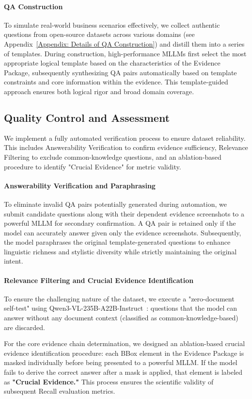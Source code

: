 \documentclass{llmxive}
\begin{document}
{\paragraph{QA Construction}
To simulate real-world business scenarios effectively, we collect authentic questions from open-source datasets across various domains (see Appendix~\ref{Appendix: Details of QA Construction}) and distill them into a series of templates. During construction, high-performance MLLMs first select the most appropriate logical template based on the characteristics of the Evidence Package, subsequently synthesizing QA pairs automatically based on template constraints and core information within the evidence. This template-guided approach ensures both logical rigor and broad domain coverage.

\subsection{Quality Control and Assessment}
We implement a fully automated verification process to ensure dataset reliability. This includes Answerability Verification to confirm evidence sufficiency, Relevance Filtering to exclude common-knowledge questions, and an ablation-based procedure to identify "Crucial Evidence" for metric validity.
\paragraph{Answerability Verification and Paraphrasing}
To eliminate invalid QA pairs potentially generated during automation, we submit candidate questions along with their dependent evidence screenshots to a powerful MLLM for secondary confirmation. A QA pair is retained only if the model can accurately answer given only the evidence screenshots. Subsequently, the model paraphrases the original template-generated questions to enhance linguistic richness and stylistic diversity while strictly maintaining the original intent.
\paragraph{Relevance Filtering and Crucial Evidence Identification}
To ensure the challenging nature of the dataset, we execute a "zero-document self-test" using Qwen3-VL-235B-A22B-Instruct~\citep{bai2025qwen3}: questions that the model can answer without any document context (classified as common-knowledge-based) are discarded.

For the core evidence chain determination, we designed an ablation-based crucial evidence identification procedure: each BBox element in the Evidence Package is masked individually before being presented to a powerful MLLM. If the model fails to derive the correct answer after a mask is applied, that element is labeled as \textbf{"Crucial Evidence."} This process ensures the scientific validity of subsequent Recall evaluation metrics.

}
\end{document}
